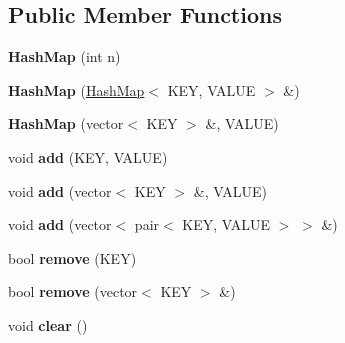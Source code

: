 \subsection*{Public Member Functions}
\begin{DoxyCompactItemize}
\item 
\hypertarget{class_hash_map_a921ee1145e96f83f3776f0100b8f7275}{}{\bfseries Hash\+Map} (int n)\label{class_hash_map_a921ee1145e96f83f3776f0100b8f7275}

\item 
\hypertarget{class_hash_map_a2a86d581bca37b123a56f1198337a792}{}{\bfseries Hash\+Map} (\hyperlink{class_hash_map}{Hash\+Map}$<$ K\+E\+Y, V\+A\+L\+U\+E $>$ \&)\label{class_hash_map_a2a86d581bca37b123a56f1198337a792}

\item 
\hypertarget{class_hash_map_a65b3b62f510bb745a886ef7e9618324c}{}{\bfseries Hash\+Map} (vector$<$ K\+E\+Y $>$ \&, V\+A\+L\+U\+E)\label{class_hash_map_a65b3b62f510bb745a886ef7e9618324c}

\item 
\hypertarget{class_hash_map_a6c177f77bc0b96cd6c6c1601b3e0714e}{}void {\bfseries add} (K\+E\+Y, V\+A\+L\+U\+E)\label{class_hash_map_a6c177f77bc0b96cd6c6c1601b3e0714e}

\item 
\hypertarget{class_hash_map_a8178f15b99b857b84ea88ebabf4fe53b}{}void {\bfseries add} (vector$<$ K\+E\+Y $>$ \&, V\+A\+L\+U\+E)\label{class_hash_map_a8178f15b99b857b84ea88ebabf4fe53b}

\item 
\hypertarget{class_hash_map_ac56f67e281f1bd91539035535c815121}{}void {\bfseries add} (vector$<$ pair$<$ K\+E\+Y, V\+A\+L\+U\+E $>$ $>$ \&)\label{class_hash_map_ac56f67e281f1bd91539035535c815121}

\item 
\hypertarget{class_hash_map_a0cc42915eadab1175b35cbee6cd658c1}{}bool {\bfseries remove} (K\+E\+Y)\label{class_hash_map_a0cc42915eadab1175b35cbee6cd658c1}

\item 
\hypertarget{class_hash_map_ac1997800708d2723afba29bbd4d494bf}{}bool {\bfseries remove} (vector$<$ K\+E\+Y $>$ \&)\label{class_hash_map_ac1997800708d2723afba29bbd4d494bf}

\item 
\hypertarget{class_hash_map_aa63e547f51d713c06d7e70c0a3fc23ad}{}void {\bfseries clear} ()\label{class_hash_map_aa63e547f51d713c06d7e70c0a3fc23ad}


\end{DoxyCompactItemize}
